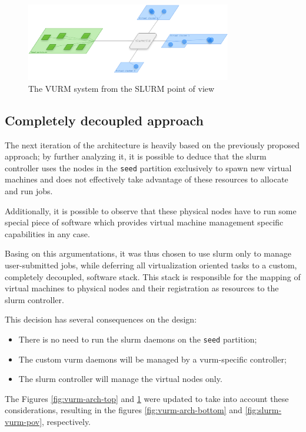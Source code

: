 \begin{figure}[ht]
	\centering
	\includegraphics[width=0.8\textwidth]{figures/slurm-pov}
	\caption{The VURM system from the SLURM point of view}
	\label{fig:slurm-pov}
\end{figure}


\subsection{Completely decoupled approach}

The next iteration of the architecture is heavily based on the previously proposed approach; by further analyzing it, it is possible to deduce that the \gls{slurm} controller uses the nodes in the \texttt{seed} partition exclusively to spawn new virtual machines and does not effectively take advantage of these resources to allocate and run jobs.

Additionally, it is possible to observe that these physical nodes have to run some special piece of software which provides virtual machine management specific capabilities in any case.

Basing on this argumentations, it was thus chosen to use \gls{slurm} only to manage user-submitted jobs, while deferring all virtualization oriented tasks to a custom, completely decoupled, software stack. This stack is responsible for the mapping of virtual machines to physical nodes and their registration as resources to the \gls{slurm} controller.

This decision has several consequences on the design:

\begin{itemize}
	\item There is no need to run the \gls{slurm} daemons on the \texttt{seed} partition;
	\item The custom \gls{vurm} daemons will be managed by a \gls{vurm}-specific controller;
	\item The \gls{slurm} controller will manage the virtual nodes only.
\end{itemize}

The Figures \ref{fig:vurm-arch-top} and \ref{fig:slurm-pov} were updated to take into account these considerations, resulting in the figures \ref{fig:vurm-arch-bottom} and \ref{fig:slurm-vurm-pov}, respectively.


